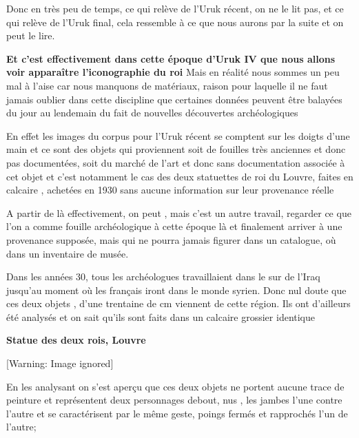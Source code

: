 \documentclass[a4paper,10pt]{article}
\newcommand{\DirImg}{../img/FaivreMartin/}
\begin{document}
Donc en très peu de temps, ce qui relève de l'Uruk récent, on ne le lit pas, 
et ce qui relève de l'Uruk final, cela ressemble à ce que nous aurons par la 
suite et on peut le lire.






\textbf{Et c'est effectivement dans cette époque
d'Uruk IV que nous allons voir apparaître
l'iconographie du roi} Mais en réalité nous sommes un
peu mal à l'aise car nous manquons de matériaux,
raison pour laquelle il ne faut jamais oublier dans cette discipline
que certaines données peuvent être balayées du jour au lendemain du
fait de nouvelles découvertes archéologiques

En effet les images du corpus pour l'Uruk récent se
comptent sur les doigts d'une main et ce sont des
objets qui proviennent soit de fouilles très anciennes et donc pas
documentées, soit du marché de l'art et donc sans
documentation associée à cet objet et c'est notamment
le cas des deux statuettes de roi du Louvre, faites en calcaire ,
achetées en 1930 sans aucune information sur leur provenance réelle

A partir de là effectivement, on peut , mais c'est un
autre travail, regarder ce que l'on a comme fouille
archéologique à cette époque là et finalement arriver à une provenance
supposée, mais qui ne pourra jamais figurer dans un catalogue, où dans
un inventaire de musée.

Dans les années 30, tous les archéologues travaillaient dans le sur de
l'Iraq jusqu'au moment où les
français iront dans le monde syrien. Donc nul doute que ces deux objets
, d'une trentaine de cm viennent de cette région. Ils
ont d'ailleurs été analysés et on sait
qu'ils sont faits dans un calcaire grossier identique

\textbf{Statue des deux rois, Louvre}

  [Warning: Image ignored] %
 

En les analysant on s'est aperçu que ces deux objets ne
portent aucune trace de peinture et représentent deux personnages
debout, nus , les jambes l'une contre
l'autre et se caractérisent par le même geste,  poings
fermés et rapprochés l'un de l'autre;
\end{document}
